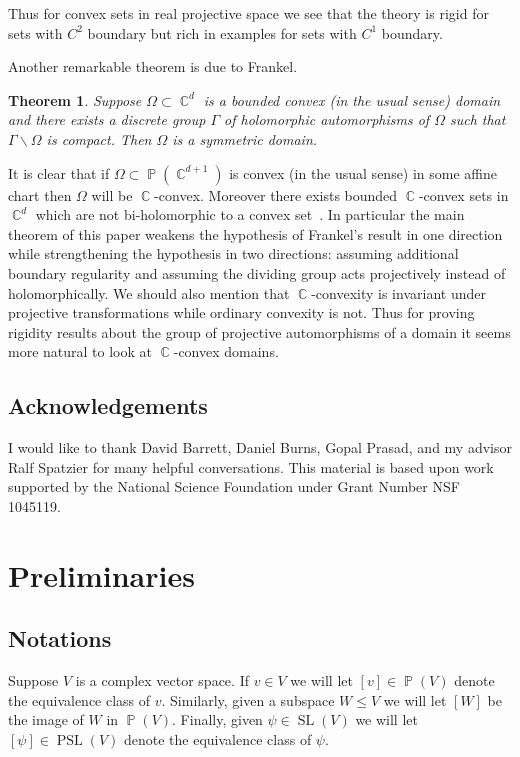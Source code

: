 \documentclass[12pt]{amsart}
\theoremstyle{plain}
\newtheorem{theorem}[proposition]{Theorem}
\theoremstyle{definition}
\theoremstyle{remark}
\begin{document}
Thus for convex sets in real projective space we see that the theory is rigid for sets with $C^2$ boundary but rich in examples for sets with $C^1$ boundary. 

Another remarkable theorem is due to Frankel.

\begin{theorem}\cite{F1989}
Suppose $\Omega \subset \operatorname{\mathbb{C}}^d$ is a bounded convex (in the usual sense) domain and there exists a discrete group $\Gamma$ of holomorphic automorphisms of $\Omega$ such that $\Gamma \backslash \Omega$ is compact. Then $\Omega$ is a symmetric domain.
\end{theorem}

It is clear that if $\Omega \subset \operatorname{\mathbb{P}}(\operatorname{\mathbb{C}}^{d+1})$ is convex (in the usual sense) in some affine chart then $\Omega$ will be $\operatorname{\mathbb{C}}$-convex. Moreover there exists bounded $\operatorname{\mathbb{C}}$-convex sets in $\operatorname{\mathbb{C}}^d$ which are not bi-holomorphic to a convex set~\cite{NPZ2008}.  In particular the main theorem of this paper weakens the hypothesis of Frankel's result in one direction while strengthening the hypothesis in two directions: assuming additional boundary regularity and assuming the dividing group acts projectively instead of holomorphically. We should also mention that $\operatorname{\mathbb{C}}$-convexity is invariant under projective transformations while ordinary convexity is not. Thus for proving rigidity results about the group of projective automorphisms of a domain it seems more natural to look at $\operatorname{\mathbb{C}}$-convex domains.

\subsection*{Acknowledgements}

I would like to thank David Barrett, Daniel Burns, Gopal Prasad, and my advisor Ralf Spatzier for many helpful conversations. This material is based upon work supported by the National Science Foundation under Grant Number NSF 1045119.

\section{Preliminaries}\label{sec:prelim}

\subsection{Notations} Suppose $V$ is a complex vector space. If $v \in V$ we will let $[v] \in \operatorname{\mathbb{P}}(V)$ denote the equivalence class of $v$. Similarly, given a subspace $W \leq V$ we will let $[W]$ be the image of $W$ in $\operatorname{\mathbb{P}}(V)$. Finally, given $\psi \in \operatorname{SL}(V)$ we will let $[\psi] \in \operatorname{PSL}(V)$ denote the equivalence class of $\psi$. 
\end{document}
